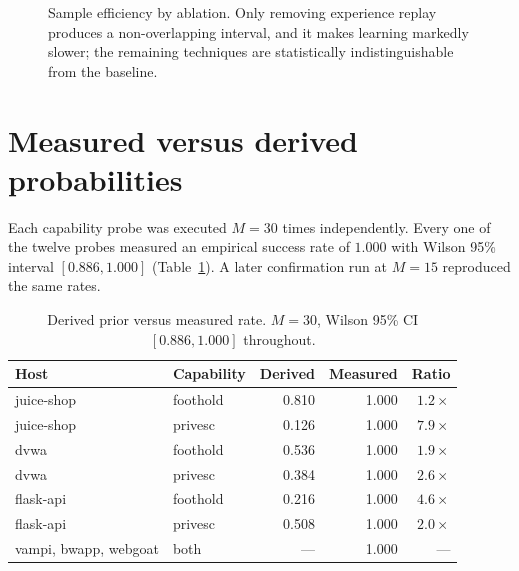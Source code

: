 \documentclass[11pt,a4paper]{report}
\begin{document}
\begin{figure}[h]
\centering
{}
\caption{Sample efficiency by ablation. Only removing experience replay produces
a non-overlapping interval, and it makes learning markedly slower; the remaining
techniques are statistically indistinguishable from the baseline.}
\label{fig:ablation}
\end{figure}

\section{Measured versus derived probabilities}
\label{sec:measured}
Each capability probe was executed $M=30$ times independently. Every one of the
twelve probes measured an empirical success rate of $1.000$ with Wilson 95\%
interval $[0.886, 1.000]$ (Table~\ref{tab:gap}). A later confirmation run at
$M=15$ reproduced the same rates.

\begin{table}[h]
\centering
\caption{Derived prior versus measured rate. $M=30$, Wilson 95\% CI
$[0.886, 1.000]$ throughout.}
\label{tab:gap}
\begin{tabular}{llrrr}
\toprule
\textbf{Host} & \textbf{Capability} & \textbf{Derived} & \textbf{Measured} & \textbf{Ratio}\\
\midrule
juice-shop & foothold & 0.810 & 1.000 & $1.2\times$\\
juice-shop & privesc  & \textcolor{accent}{0.126} & 1.000 & \textcolor{accent}{$7.9\times$}\\
dvwa       & foothold & 0.536 & 1.000 & $1.9\times$\\
dvwa       & privesc  & 0.384 & 1.000 & $2.6\times$\\
flask-api  & foothold & 0.216 & 1.000 & $4.6\times$\\
flask-api  & privesc  & 0.508 & 1.000 & $2.0\times$\\
\midrule
vampi, bwapp, webgoat & both & --- & 1.000 & ---\\
\bottomrule
\end{tabular}
\end{table}
\end{document}
